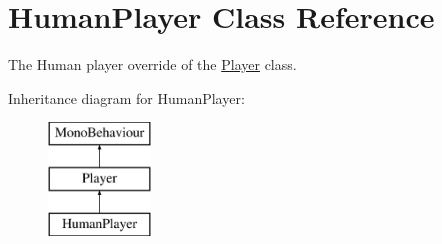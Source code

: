 \hypertarget{class_human_player}{}\section{Human\+Player Class Reference}
\label{class_human_player}


The Human player override of the \hyperlink{class_player}{Player} class.  


Inheritance diagram for Human\+Player\+:\begin{figure}[H]
\begin{center}
\leavevmode
\includegraphics[height=3.000000cm]{class_human_player}
\end{center}
\end{figure}
